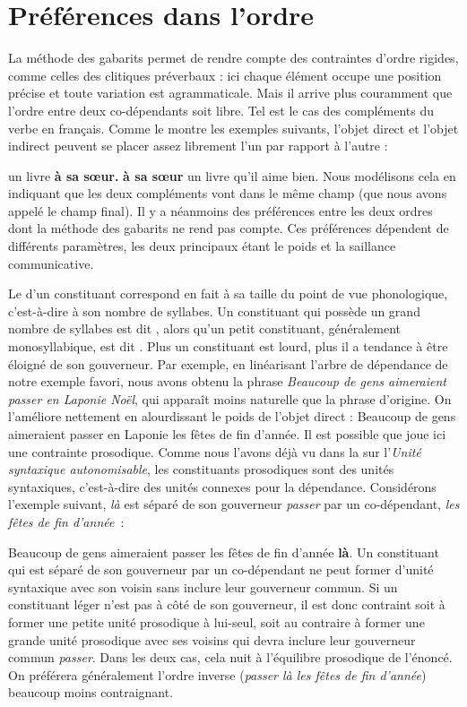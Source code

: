 \section{Préférences dans l’ordre}\label{sec:3.5.21}

La méthode des gabarits permet de rendre compte des contraintes d’ordre rigides, comme celles des clitiques préverbaux : ici chaque élément occupe une position précise et toute variation est agrammaticale. Mais il arrive plus couramment que l’ordre entre deux co-dépendants soit libre. Tel est le cas des compléments du verbe en français. Comme le montre les exemples suivants, l’objet direct et l’objet indirect peuvent se placer assez librement l’un par rapport à l’autre :

\ea {} un livre \textbf{{à sa sœur.}}
     \textbf{{à sa sœur}} un livre qu’il aime bien.
    \z
\z
Nous modélisons cela en indiquant que les deux compléments vont dans le même champ (que nous avons appelé le champ final). Il y a néanmoins des préférences entre les deux ordres dont la méthode des gabarits ne rend pas compte. Ces préférences dépendent de différents paramètres, les deux principaux étant le poids et la saillance communicative.

Le  d’un constituant correspond en fait à sa taille du point de vue phonologique, c’est-à-dire à son nombre de syllabes. Un constituant qui possède un grand nombre de syllabes est dit , alors qu’un petit constituant, généralement monosyllabique, est dit . Plus un constituant est lourd, plus il a tendance à être éloigné de son gouverneur. Par exemple, en linéarisant l’arbre de dépendance de notre exemple favori, nous avons obtenu la phrase \textit{Beaucoup de gens aimeraient passer en Laponie Noël}, qui apparaît moins naturelle que la phrase d’origine. On l’améliore nettement en alourdissant le poids de l’objet direct :
\ea
    {Beaucoup de gens aimeraient passer en Laponie les fêtes de fin d’année}.
\z
Il est possible que joue ici une contrainte prosodique. Comme nous l’avons déjà vu dans la  sur l’\textit{Unité syntaxique autonomisable}, les constituants prosodiques sont des unités syntaxiques, c’est-à-dire des unités connexes pour la dépendance. Considérons l’exemple suivant, \textit{là} est séparé de son gouverneur \textit{passer} par un co-dépendant, \textit{les fêtes de fin d’année~}:

\ea
{Beaucoup de gens aimeraient passer les fêtes de fin d’année} \textbf{{là}}.
\z
Un constituant qui est séparé de son gouverneur par un co-dépendant ne peut former d’unité syntaxique avec son voisin sans inclure leur gouverneur commun. Si un constituant léger n’est pas à côté de son gouverneur, il est donc contraint soit à former une petite unité prosodique à lui-seul, soit au contraire à former une grande unité prosodique avec ses voisins qui devra inclure leur gouverneur commun \textit{passer}. Dans les deux cas, cela nuit à l’équilibre prosodique de l’énoncé. On préférera généralement l’ordre inverse (\textit{passer là les fêtes de fin d’année}) beaucoup moins contraignant.

